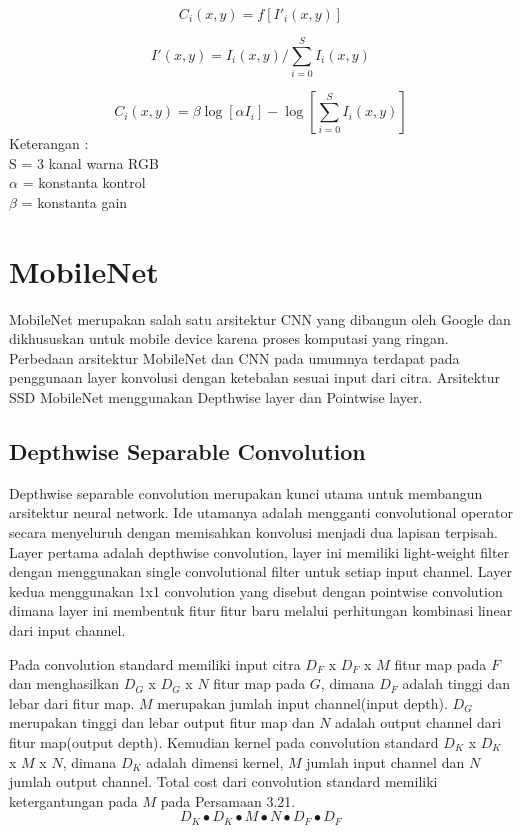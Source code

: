 \begin{equation}
	C_i(x,y) = f[I'_i(x,y)]
\end{equation}

\begin{equation}
	I'(x,y) = I_i(x,y) / \sum_{i=0}^{S}I_i(x,y)
\end{equation}

\begin{equation}
	C_i(x,y) = \beta {\log[\alpha I_i]-\log[\sum_{i=0}^{S}I_i(x,y)]}
\end{equation}
Keterangan :\\
S = 3 kanal warna RGB\\
$\alpha$ = konstanta kontrol\\
$\beta$ = konstanta gain
\section{MobileNet}
MobileNet merupakan salah satu arsitektur CNN yang dibangun oleh Google dan dikhususkan untuk mobile device karena proses komputasi yang ringan. Perbedaan arsitektur MobileNet dan CNN pada umumnya terdapat pada penggunaan layer konvolusi dengan ketebalan sesuai input dari citra. Arsitektur SSD MobileNet menggunakan Depthwise layer dan Pointwise layer.
\subsection{Depthwise Separable Convolution}
Depthwise separable convolution merupakan kunci utama untuk membangun arsitektur neural network. Ide utamanya adalah mengganti convolutional operator secara menyeluruh dengan memisahkan konvolusi menjadi dua lapisan terpisah. Layer pertama adalah depthwise convolution, layer ini memiliki light-weight filter dengan menggunakan single convolutional filter untuk setiap input channel. Layer kedua menggunakan 1x1 convolution yang disebut dengan pointwise convolution dimana layer ini membentuk fitur fitur baru melalui perhitungan kombinasi linear dari input channel. 

Pada convolution standard memiliki input citra $D_F$ x $D_F$ x $M $ fitur map pada $F$ dan menghasilkan $ D_G$ x $D_G$ x $N $ fitur map pada $G$, dimana $D_F$ adalah tinggi dan lebar dari fitur map. $M$ merupakan jumlah input channel(input depth). 
$D_G$ merupakan tinggi dan lebar output fitur map dan $N$ adalah output channel dari fitur map(output depth). Kemudian kernel pada convolution standard $D_K$ x $D_K$ x $M$ x $N$, dimana $D_K$ adalah dimensi kernel, $M$ jumlah input channel dan $N$ jumlah output channel. Total cost dari convolution standard memiliki ketergantungan pada $M$ pada Persamaan 3.21.
\begin{equation}
	D_K \bullet D_K \bullet M \bullet N \bullet D_F \bullet D_F
\end{equation}

